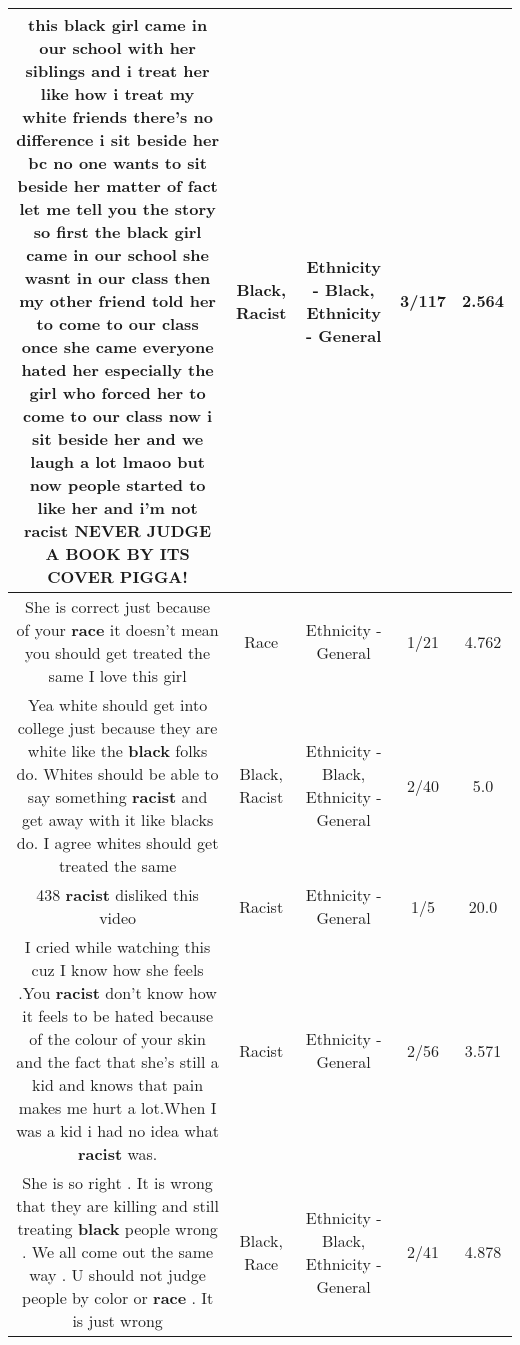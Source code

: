 \documentclass[11pt]{article}
\newlength\mylength
\begin{document}
\begin{center}
\begin{longtable}{|C{.65\mylength}|C{.30\mylength}|C{.12\mylength}|C{.12\mylength}|C{.12\mylength}|}
  \small this \textbf{black} girl came in our school with her siblings and i treat her like how i treat my white friends there's no difference i sit beside her bc no one wants to sit beside her matter of fact let me tell you the story so first the \textbf{black} girl came in our school she wasnt in our class then my other friend told her to come to our class once she came everyone hated her especially the  girl who forced her to come to our class now i sit beside her and we laugh a lot lmaoo but now people started to like her and i'm not \textbf{racist} NEVER JUDGE A BOOK BY ITS COVER PIGGA!\normalsize   & Black, Racist & Ethnicity - Black, Ethnicity - General & 3/117 & 2.564 \\  \hline
  \small She is correct just because of your \textbf{race}  it doesn't mean you should get treated the same I love this girl\normalsize   & Race & Ethnicity - General & 1/21 & 4.762 \\  \hline
  \small Yea white should get into college just because they are white like the \textbf{black} folks do. Whites should be able to say something \textbf{racist} and get away with it like blacks do. I agree whites should get treated the same\normalsize   & Black, Racist & Ethnicity - Black, Ethnicity - General & 2/40 & 5.0 \\  \hline
  \small 438 \textbf{racist} disliked this video\normalsize   & Racist & Ethnicity - General & 1/5 & 20.0 \\  \hline
  \small I cried while watching this cuz I know how she feels .You \textbf{racist} don't know how it feels to be hated because of the colour of your skin and the fact that she's still a kid and knows that pain makes me hurt a lot.When I was a kid i had no idea what \textbf{racist} was.\normalsize   & Racist & Ethnicity - General & 2/56 & 3.571 \\  \hline
  \small She is so right . It is wrong that they are killing and still treating \textbf{black} people wrong . We all come out the same way . U should not judge people by color or \textbf{race} . It is just wrong\normalsize   & Black, Race & Ethnicity - Black, Ethnicity - General & 2/41 & 4.878 \\  \hline

\end{longtable}
\end{center}
\end{document}
